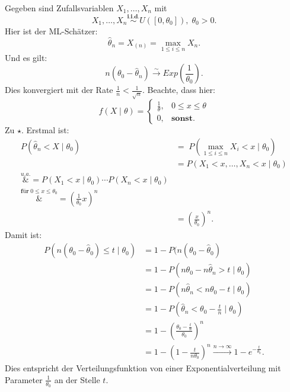 \documentclass[10pt]{article}
\newcommand{\FZV}{X_1, \ldots, X_n} %
\newcommand{\KV}{\overset{\sim} \longrightarrow} %
\newcommand{\eqname}[1]{\tag*{#1}}%
\newenvironment{BSP}[1][]
{\begin{Beispiel}[frametitle=#1]}{\end{Beispiel}}
\begin{document}
	\begin{BSP}[Beispiel 1.3.11 (Grenzverteilung keine Normalverteilung)]
		Gegeben sind Zufallsvariablen $\FZV$ mit
		\begin{equation*}
			\FZV \overset{\textbf{i.i.d.}}{\sim} U([0,\theta_0]), \; \theta_0 >0.
		\end{equation*}
		Hier ist der ML-Schätzer:
		\begin{equation*}
			\hat{\theta}_n = X_{(n)} = \underset{1\leq i \leq n}{\max} X_n. 
		\end{equation*}
		Und es gilt:
		\begin{equation*}
			n(\theta_0-\hat{\theta}_n) \KV Exp\left(\frac{1}{\theta_0}\right) \eqname{$\star$}.
		\end{equation*}
		Dies konvergiert mit der Rate $\frac{1}{n} < \frac{1}{\sqrt{n}}$.
		Beachte, dass hier:
		\begin{equation*}
			f(X\mid \theta) =
			\begin{cases}
				\frac{1}{\theta}, &0\leq x\leq \theta\\
				0, &\textbf{sonst}.
			\end{cases}
		\end{equation*}
		Zu $\star$. Erstmal ist:
		\begin{equation*}
			\begin{split}
				P(\hat{\theta}_n < X \mid \theta_0) &= \; P(\underset{1\leq i \leq n}{\max} X_i < x \mid \theta_0)\\
				&= P(X_1 < x, \ldots, X_n < x \mid \theta_0)\\
				\overset{u.a.}&{=} P(X_1<x\mid \theta_0) \cdots P(X_n < x \mid \theta_0)\\
				\overset{\textbf{für} \; 0 \leq x \leq \theta_0}&{=} \left(\frac{1}{\theta_0}x\right)^{n}\\
				&=\left(\frac{x}{\theta_0}\right)^n.
			\end{split}
		\end{equation*}
		Damit ist:
		\begin{equation*}
			\begin{split}
				P (n(\theta_0 -\hat{\theta}_0) \leq t \mid \theta_0) &= 1-P(n(\theta_0 -\hat{\theta}_0) \\
				&= 1- P(n \theta_0 -n\hat{\theta}_n > t \mid \theta_0)\\
				&= 1- P(n\hat{\theta}_n < n\theta_0 - t \mid \theta_0)\\
				&= 1- P\left(\hat{\theta}_n < \theta_0 - \frac{t}{n} \mid \theta_0 \right)\\
				&= 1- \left(\frac{\theta_0 -\frac{t}{n}}{\theta_0}\right)^n\\
				&= 1- \left(1-\frac{t}{n \theta_0}\right)^n \overset{n\rightarrow \infty}\longrightarrow 1-e^{-\frac{t}{\theta_0}}.
			\end{split}
		\end{equation*}
		Dies entspricht der Verteilungsfunktion von einer Exponentialverteilung mit Parameter $\frac{1}{\theta_0}$ an der Stelle $t$.
		

\end{BSP}
\end{document}
